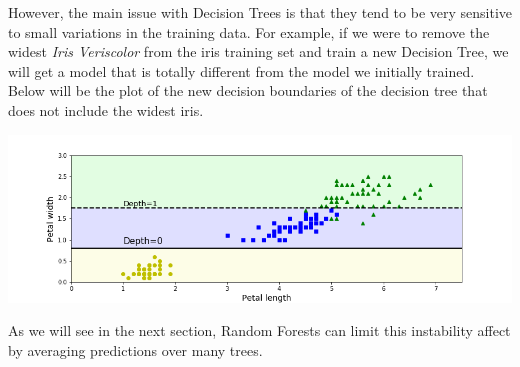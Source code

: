 \noindent
However, the main issue with Decision Trees is that they tend to be very sensitive to small variations in the training data. For example, if we 
were to remove the widest \textit{Iris Veriscolor} from the iris training set and train a new Decision Tree, we will get a model that is 
totally different from the model we initially trained. Below will be the plot of the new decision boundaries of the decision tree that does 
not include the widest iris.

\begin{center}
\includegraphics[scale=0.45]{Images/decision_tree_instability_plot.png}
\end{center}

\noindent
As we will see in the next section, Random Forests can limit this instability affect by averaging predictions over many trees.